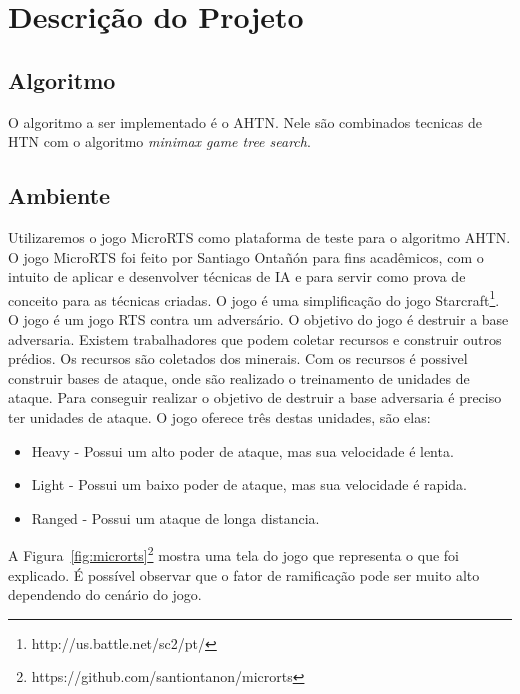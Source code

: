 \chapter{\label{chap:descr}Descrição do Projeto}

\section{Algoritmo}
O algoritmo a ser implementado é o AHTN. Nele são combinados tecnicas de HTN com o algoritmo \textit{minimax game tree search}. 

\section{Ambiente}

Utilizaremos o jogo MicroRTS como plataforma de teste para o algoritmo AHTN. O jogo MicroRTS foi feito por Santiago Ontañón \cite{ontanon2013combinatorial} para fins acadêmicos, com o intuito de aplicar e desenvolver técnicas de IA e para servir como prova de conceito para as técnicas criadas.  
O jogo é uma simplificação do jogo Starcraft\footnote{http://us.battle.net/sc2/pt/}. O jogo é um jogo RTS contra um adversário. O objetivo do jogo é destruir a base adversaria. Existem trabalhadores que podem coletar recursos e construir outros prédios. Os recursos são coletados dos minerais. Com os recursos é possivel construir bases de ataque, onde são realizado o treinamento de unidades de ataque. Para conseguir realizar o objetivo de destruir a base adversaria é preciso ter unidades de ataque. O jogo oferece três destas unidades, são elas:

\begin{itemize}
	\item Heavy - Possui um alto poder de ataque, mas sua velocidade é lenta.
	\item Light - Possui um baixo poder de ataque, mas sua velocidade é rapida.
	\item Ranged - Possui um ataque de longa distancia. 
\end{itemize} 

A Figura~\ref{fig:microrts}\footnote{https://github.com/santiontanon/microrts} mostra uma tela do jogo que representa o que foi explicado. É possível observar que o fator de ramificação pode ser muito alto dependendo do cenário do jogo. %


